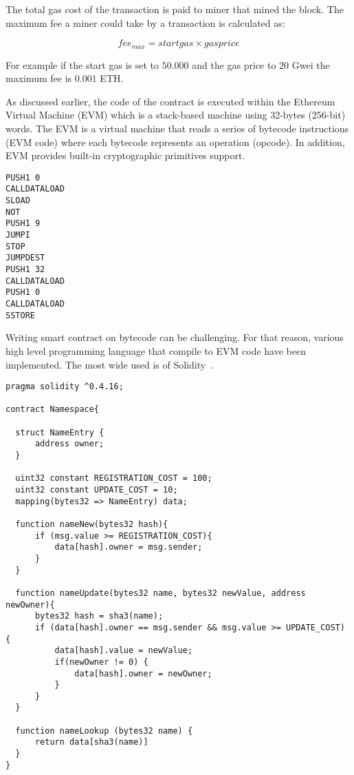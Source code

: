 The total gas cost of the transaction is paid to miner that mined the block. The maximum fee a miner could take by a transaction is calculated as:

\begin{equation*}
  fee_{max} = startgas \times gasprice
\end{equation*}

For example if the start gas is set to $50.000$ and the gas price to $20$ Gwei the maximum fee is $0.001$ ETH.

As discussed earlier, the code of the contract is executed within the Ethereum Virtual Machine (EVM) which is a stack-based machine using 32-bytes (256-bit) words. The EVM is a virtual machine that reads a series of bytecode instructions (EVM code) where each bytecode represents an operation (opcode). In addition, EVM provides built-in cryptographic primitives support.

\begin{lstlisting}[language=Solidity, caption={EVM bytecode}]
PUSH1 0
CALLDATALOAD
SLOAD
NOT
PUSH1 9
JUMPI
STOP
JUMPDEST
PUSH1 32
CALLDATALOAD
PUSH1 0
CALLDATALOAD
SSTORE
\end{lstlisting}

Writing smart contract on bytecode can be challenging. For that reason, various high level programming language that compile to EVM code have been implemented. The most wide used is of Solidity~\cite{solidity}.

\clearpage

\begin{lstlisting}[language=Solidity, caption={An Ethereum Smart Contract}]
pragma solidity ^0.4.16;

contract Namespace{

  struct NameEntry {
      address owner;
  }

  uint32 constant REGISTRATION_COST = 100;
  uint32 constant UPDATE_COST = 10;
  mapping(bytes32 => NameEntry) data;

  function nameNew(bytes32 hash){
      if (msg.value >= REGISTRATION_COST){
          data[hash].owner = msg.sender;
      }
  }

  function nameUpdate(bytes32 name, bytes32 newValue, address newOwner){
      bytes32 hash = sha3(name);
      if (data[hash].owner == msg.sender && msg.value >= UPDATE_COST) {
          data[hash].value = newValue;
          if(newOwner != 0) {
              data[hash].owner = newOwner;
          }
      }
  }

  function nameLookup (bytes32 name) {
      return data[sha3(name)]
  }
}
\end{lstlisting}

